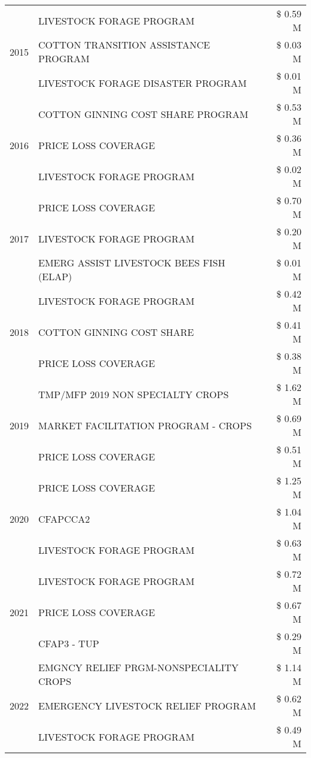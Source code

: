 \begin{tabular}{llr}
\cline{1-3}
\multirow[t]{3}{*}{2015} & LIVESTOCK FORAGE PROGRAM & \$ 0.59 M \\
 & COTTON TRANSITION ASSISTANCE PROGRAM & \$ 0.03 M \\
 & LIVESTOCK FORAGE DISASTER PROGRAM & \$ 0.01 M \\
\cline{1-3}
\multirow[t]{3}{*}{2016} & COTTON GINNING COST SHARE PROGRAM & \$ 0.53 M \\
 & PRICE LOSS COVERAGE & \$ 0.36 M \\
 & LIVESTOCK FORAGE PROGRAM & \$ 0.02 M \\
\cline{1-3}
\multirow[t]{3}{*}{2017} & PRICE LOSS COVERAGE & \$ 0.70 M \\
 & LIVESTOCK FORAGE PROGRAM & \$ 0.20 M \\
 & EMERG ASSIST LIVESTOCK BEES FISH (ELAP) & \$ 0.01 M \\
\cline{1-3}
\multirow[t]{3}{*}{2018} & LIVESTOCK FORAGE PROGRAM & \$ 0.42 M \\
 & COTTON GINNING COST SHARE & \$ 0.41 M \\
 & PRICE LOSS COVERAGE & \$ 0.38 M \\
\cline{1-3}
\multirow[t]{3}{*}{2019} & TMP/MFP 2019 NON SPECIALTY CROPS & \$ 1.62 M \\
 & MARKET FACILITATION PROGRAM - CROPS & \$ 0.69 M \\
 & PRICE LOSS COVERAGE & \$ 0.51 M \\
\cline{1-3}
\multirow[t]{3}{*}{2020} & PRICE LOSS COVERAGE & \$ 1.25 M \\
 & CFAPCCA2 & \$ 1.04 M \\
 & LIVESTOCK FORAGE PROGRAM & \$ 0.63 M \\
\cline{1-3}
\multirow[t]{3}{*}{2021} & LIVESTOCK FORAGE PROGRAM & \$ 0.72 M \\
 & PRICE LOSS COVERAGE & \$ 0.67 M \\
 & CFAP3 - TUP & \$ 0.29 M \\
\cline{1-3}
\multirow[t]{3}{*}{2022} & EMGNCY RELIEF PRGM-NONSPECIALITY CROPS & \$ 1.14 M \\
 & EMERGENCY LIVESTOCK RELIEF PROGRAM & \$ 0.62 M \\
 & LIVESTOCK FORAGE PROGRAM & \$ 0.49 M \\
\cline{1-3}
\bottomrule
\end{tabular}
